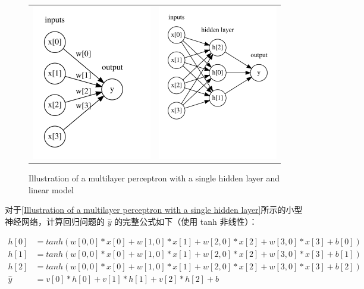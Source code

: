 \begin{figure}[h]
    \centering
    \begin{tabular}{cc}
        \includegraphics[page=1,width=.45\textwidth]{../Codes/Figures/Visualization of logistic regression.pdf} &
        \includegraphics[page=1,width=.45\textwidth]{../Codes/Figures/Illustration of a multilayer perceptron with a single hidden layer.pdf} \\
    \end{tabular}
    \caption{Illustration of a multilayer perceptron with a single hidden layer and linear model}
    \label{Illustration of a multilayer perceptron with a single hidden layer}
\end{figure}

对于\autoref{Illustration of a multilayer perceptron with a single hidden layer}所示的小型神经网络，计算回归问题的 $\hat{y}$ 的完整公式如下（使用 tanh 非线性）：

\begin{equation}
    \label{3MLP}
    \begin{split}
        h[0]    & = tanh(w[0, 0] * x[0] + w[1, 0] * x[1] + w[2, 0] * x[2] + w[3, 0] * x[3] + b[0]) \\
        h[1]    & = tanh(w[0, 0] * x[0] + w[1, 0] * x[1] + w[2, 0] * x[2] + w[3, 0] * x[3] + b[1]) \\
        h[2]    & = tanh(w[0, 0] * x[0] + w[1, 0] * x[1] + w[2, 0] * x[2] + w[3, 0] * x[3] + b[2]) \\
        \hat{y} & = v[0] * h[0] + v[1] * h[1] + v[2] * h[2] + b                                    \\
    \end{split}
\end{equation}

